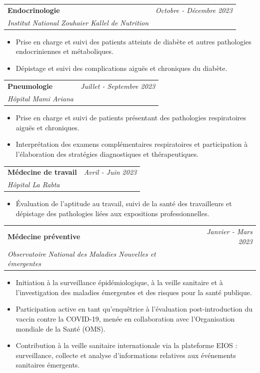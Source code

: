 \documentclass[a4paper,11pt]{article}
\makeatletter
\newcommand{\resumeSubheading}[4]{
\vspace{0.5mm}\item
    \begin{tabular*}{0.98\textwidth}[t]{l@{\extracolsep{\fill}}r}
        \textbf{#1} & \textit{\footnotesize{#4}} \\
        \textit{\footnotesize{#3}} &  \footnotesize{#2}\\
    \end{tabular*}
    \vspace{-2.4mm}
}
\newcommand{\resumeItemListStart}{\begin{itemize}[leftmargin=*,labelsep=1mm,itemsep=0.5mm]}
\newcommand{\resumeItemListEnd}{\end{itemize}\vspace{-2mm}}
\makeatother
\begin{document}
    \resumeSubheading
      {{Endocrinologie}}{}
      {Institut National Zouhaier Kallel de Nutrition}{Octobre - Décembre 2023}
      \resumeItemListStart
        \item Prise en charge et suivi des patients atteints de diabète et autres pathologies endocriniennes \newline et métaboliques.
        \item Dépistage et suivi des complications aiguës et chroniques du diabète.
    \resumeItemListEnd

    \resumeSubheading
      {{Pneumologie}}{}
      {Hôpital Mami Ariana }{Juillet - Septembre 2023}
      \resumeItemListStart
        \item Prise en charge et suivi de patients présentant des pathologies respiratoires aiguës \newline et chroniques.
        \item Interprétation des examens complémentaires respiratoires et participation à l’élaboration \newline des stratégies diagnostiques et thérapeutiques.
    \resumeItemListEnd

    \resumeSubheading
      {{Médecine de travail}}{}
      {Hôpital La Rabta}{Avril - Juin 2023}
      \resumeItemListStart
        \item Évaluation de l’aptitude au travail, suivi de la santé des travailleurs et dépistage des \newline pathologies liées aux expositions professionnelles.
    \resumeItemListEnd

    \resumeSubheading
      {{Médecine préventive}}{}
      {Observatoire National des Maladies Nouvelles et émergentes}{Janvier - Mars 2023}
      \resumeItemListStart
        \item Initiation à la surveillance épidémiologique, à la veille sanitaire et à l’investigation des \newline maladies émergentes et des risques pour la santé publique.
        \item Participation active en tant qu’enquêtrice à l’évaluation post-introduction du vaccin \newline contre la COVID-19, menée en collaboration avec l’Organisation mondiale de la Santé (OMS).
        \item Contribution à la veille sanitaire internationale via la plateforme EIOS : surveillance, \newline collecte et analyse d’informations relatives aux événements sanitaires émergents.
    \resumeItemListEnd
\end{document}
